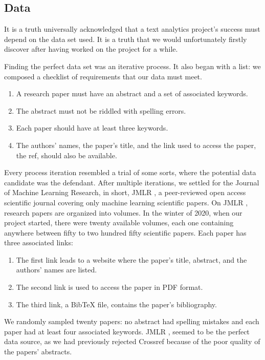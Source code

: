 \subsection{Data}

It is a truth universally acknowledged that a text analytics project's success must depend on the data set used. It is a truth that we would unfortunately firstly discover after having worked on the project for a while. 


Finding the perfect data set was an iterative process. It also began with a list: we composed a checklist of requirements that our data must meet. 
\begin{enumerate}
	\item A research paper must have an abstract and a set of associated keywords. 
	\item The abstract must not be riddled with spelling errors. 
	\item Each paper should have at least three keywords.
	\item The authors' names, the paper's title, and the link used to access the paper, the ref, should also be available.
\end{enumerate}

Every process iteration resembled a trial of some sorts, where the potential data candidate was the defendant. After multiple iterations, we settled for the Journal of Machine Learning Research, in short, JMLR \cite{jmlr}, a peer-reviewed open access scientific journal covering only machine learning scientific papers.
On JMLR \cite{jmlr}, research papers are organized into volumes. In the winter of 2020, when our project started, there were twenty available volumes, each one containing anywhere between fifty to two hundred fifty scientific papers. Each paper has three associated links: 
\begin{enumerate}
	\item The first link leads to a website where the paper's title, abstract, and the authors' names are listed. 
	\item The second link is used to access the paper in PDF format. 
	\item The third link, a BibTeX file, contains the paper's bibliography.
\end{enumerate}

We randomly sampled twenty papers: no abstract had spelling mistakes and each paper had at least four associated keywords. JMLR \cite{jmlr}, seemed to be the perfect data source, as we had previously rejected Crossref \cite{crossref} because of the poor quality of the papers' abstracts.


